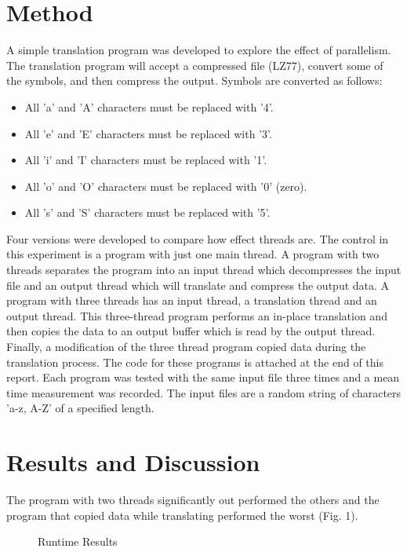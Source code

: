 \documentclass[a4paper,12pt]{article}
\begin{document}
\section{Method}
A simple translation program was developed to explore the effect of parallelism.
The translation program will accept a compressed file (LZ77), convert some of the symbols, and then compress the output.
Symbols are converted as follows:
\begin{itemize}
  \item All 'a' and 'A' characters must be replaced with '4'.
  \item All 'e' and 'E' characters must be replaced with '3'.
  \item All 'i' and 'I' characters must be replaced with '1'.
  \item All 'o' and 'O' characters must be replaced with '0' (zero).
  \item All 's' and 'S' characters must be replaced with '5'.
\end{itemize}
Four versions were developed to compare how effect threads are.
The control in this experiment is a program with just one main thread.
A program with two threads separates the program into an input thread which decompresses the input file and an output thread which will translate and compress the output data.
A program with three threads has an input thread, a translation thread and an output thread.
This three-thread program performs an in-place translation and then copies the data to an output buffer which is read by the output thread.
Finally, a modification of the three thread program copied data during the translation process.
The code for these programs is attached at the end of this report.
Each program was tested with the same input file three times and a mean time measurement was recorded.
The input files are a random string of characters 'a-z, A-Z' of a specified length.

\section{Results and Discussion}
The program with two threads significantly out performed the others and the program that copied data while translating performed the worst (Fig. 1).

\begin{figure}[h]
  \caption{Runtime Results}
\end{figure}
\end{document}
